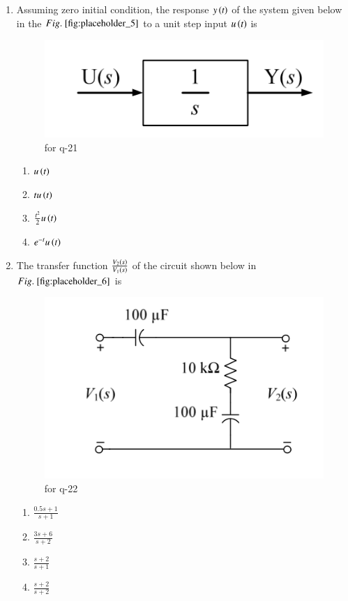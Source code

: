 \documentclass[journal,12pt,onecolumn]{IEEEtran}
\theoremstyle{remark}
\begin{document}
\begin{enumerate}
\item Assuming zero initial condition, the response $y\left(t\right)$ of the system given below in the $\figref{fig:placeholder_5}$ to a unit step input $u\left(t\right)$ is  
\begin{figure}[H]
    \centering
    \includegraphics[width=0.5\columnwidth]{figs/fig_5.png}
    \caption{\centering for q-21}
    \label{fig:placeholder_5}
\end{figure}
\begin{multicols}{4}
\begin{enumerate}
\item $u\left(t\right)$
\item $t u\left(t\right)$
\item $\frac{t^2}{2} u\left(t\right)$
\item $e^{-t} u\left(t\right)$
\end{enumerate}
\end{multicols}
\hfill {}

\item The transfer function $\frac{V_2\left(s\right)}{V_1\left(s\right)}$ of the circuit shown below in $\figref{fig:placeholder_6}$ is  
\begin{figure}[H]
    \centering
    \includegraphics[width=0.5\columnwidth]{figs/fig_6.png}
    \caption{\centering for q-22}
    \label{fig:placeholder_6}
\end{figure}

\begin{multicols}{2}
\begin{enumerate}
\item $\frac{0.5s + 1}{s + 1}$
\item $\frac{3s + 6}{s + 2}$
\item $\frac{s + 2}{s + 1}$
\item $\frac{s + 2}{s + 2}$
\end{enumerate}
\end{multicols}
\hfill {}


\end{enumerate}
\end{document}

